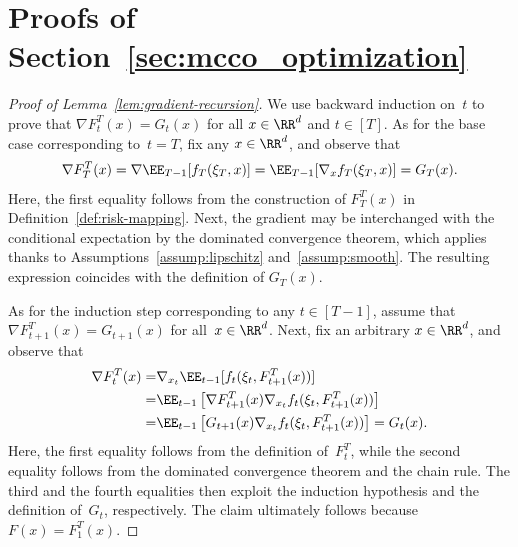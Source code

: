 \documentclass[11pt]{article}
\begin{document}

\section{Proofs of Section~\ref{sec:mcco_optimization}}

\begin{proof}[Proof of Lemma~\ref{lem:gradient-recursion}]
    We use backward induction on~$t$ to prove that $\nabla F_t^T(x)= G_t(x)$ for all $x\in \RR^d$ and $t\in[T]$. As for the base case corresponding to~$t=T$, fix any $x\in\RR^d$, and observe that
    \begin{align*}
        \nabla F_T^T(x) = \nabla \EE_{T-1}[f_T(\xi_T,x)]=\EE_{T-1}[\nabla_x f_T(\xi_T,x)]=G_T(x).
    \end{align*}
    Here, the first equality follows from the construction of $F_T^T(x)$ in Definition~\ref{def:risk-mapping}. Next, the gradient may be interchanged with the conditional expectation by the dominated convergence theorem, which applies thanks to Assumptions~\ref{assump:lipschitz} and~\ref{assump:smooth}. The resulting expression coincides with the definition of $G_T(x)$. 
    
    As for the induction step corresponding to any $t\in[T-1]$, assume that $\nabla F_{t+1}^T(x) = G_{t+1}(x)$ for all~$x\in\RR^d$. Next, fix an arbitrary $x\in\RR^d$, and observe that
    \begin{align*}
        \nabla F_t^T(x) =& \nabla_{x_t} \EE_{t-1}[f_t(\xi_t,F_{t+1}^T(x))]\\
        =& \EE_{t-1}\left[ \nabla F_{t+1}^T(x)  \nabla_{x_t} f_t(\xi_t,F_{t+1}^T(x))\right] \\
        =& \EE_{t-1}\left[ G_{t+1}(x) \nabla_{x_t} f_t(\xi_t,F_{t+1}^T(x))\right] = G_t(x).
    \end{align*}
    Here, the first equality follows from the definition of~$F_t^T$, while the second equality follows from the dominated convergence theorem and the chain rule. The third and the fourth equalities then exploit the induction hypothesis and the definition of~$G_t$, respectively. The claim ultimately follows because $F(x)=F_1^T(x)$.
\end{proof}
\end{document}
